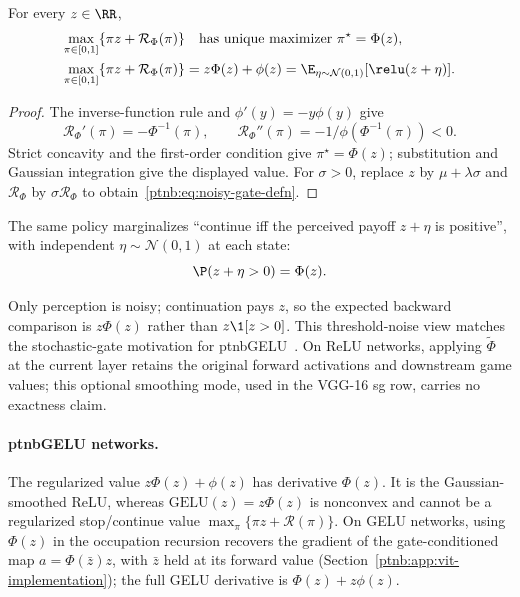 \begin{lemmaenv}\label{ptnb:lem:noisy-gate-dual}
For every $z\in\RR$,
\begin{align}
    \max_{\pi\in[0,1]}\{\pi z+\mathcal R_\Phi(\pi)\}
        &\quad\text{has unique maximizer }\pi^\star=\Phi(z),\label{ptnb:eq:noisy-gate-objective}\\
    \max_{\pi\in[0,1]}\{\pi z+\mathcal R_\Phi(\pi)\}
        &=z\Phi(z)+\phi(z)=\E_{\eta\sim\mathcal N(0,1)}[\relu(z+\eta)].\label{ptnb:eq:noisy-gate-optimum}
\end{align}
\end{lemmaenv}
\begin{proof}
The inverse-function rule and $\phi'(y)=-y\phi(y)$ give
\begin{equation}\label{ptnb:eq:noisy-gate-deriv}
    \mathcal R_\Phi'(\pi)=-\Phi^{-1}(\pi),\qquad
    \mathcal R_\Phi''(\pi)=-1/\phi(\Phi^{-1}(\pi))<0.
\end{equation}
Strict concavity and the first-order condition give $\pi^\star=\Phi(z)$; substitution and Gaussian
integration give the displayed value. For $\sigma>0$, replace $z$ by $\mu+\lambda\sigma$ and
$\mathcal R_\Phi$ by $\sigma\mathcal R_\Phi$ to obtain~\eqref{ptnb:eq:noisy-gate-defn}.
\end{proof}

\begin{remark}\label{ptnb:rem:noisy-gate-perception}
The same policy marginalizes ``continue iff the perceived payoff $z+\eta$ is positive'', with
independent $\eta\sim\mathcal N(0,1)$ at each state:
\begin{equation}\label{ptnb:eq:noisy-gate-marginal}
    \P(z+\eta>0)=\Phi(z).
\end{equation}
{\setlength{\emergencystretch}{1em}%
Only perception is noisy; continuation pays $z$, so the expected backward comparison is
$z\Phi(z)$ rather than $z\1[z>0]$. This threshold-noise view matches the stochastic-gate motivation
for \acs{ptnbGELU}~\parencite{Hendrycks2016}. On ReLU networks, applying $\tilde\Phi$ at the current
layer retains the original forward activations and downstream game values; this optional smoothing
mode, used in the VGG-16 \ac{sg} row, carries no exactness claim.\par}
\end{remark}

\paragraph{\acs{ptnbGELU} networks.}\label{ptnb:app:gelu-noisy-gate}
The regularized value $z\Phi(z)+\phi(z)$ has derivative $\Phi(z)$. It is the Gaussian-smoothed ReLU,
whereas $\mathrm{GELU}(z)=z\Phi(z)$ is nonconvex and cannot be a regularized stop/continue value
$\max_\pi\{\pi z+\mathcal R(\pi)\}$. On GELU networks, using $\Phi(z)$ in the occupation recursion
recovers the gradient of the gate-conditioned map $a=\Phi(\bar z)z$, with $\bar z$ held at its forward value
(Section~\ref{ptnb:app:vit-implementation}); the full GELU derivative is $\Phi(z)+z\phi(z)$.

